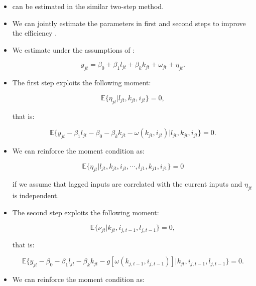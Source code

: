 \documentclass[]{book}
\providecommand{\tightlist}{%
  \setlength{\itemsep}{0pt}\setlength{\parskip}{0pt}}
\theoremstyle{definition}
\theoremstyle{definition}
\theoremstyle{definition}
\theoremstyle{remark}
\begin{document}
\begin{itemize}
\tightlist
\item
  \citet{Levinsohn2003} can be estimated in the similar two-step method.
\item
  We can jointly estimate the parameters in first and second steps to
  improve the efficiency \citep{Wooldridge2009}.
\item
  We estimate under the assumptions of \citet{Olley1996}:

  \begin{equation}
  y_{jt} = \beta_0 + \beta_1 l_{jt} + \beta_k k_{jt} + \omega_{jt} + \eta_{jt}.
  \end{equation}
\item
  The first step exploits the following moment:

  \begin{equation}
  \mathbb{E}\{\eta_{jt}|l_{jt}, k_{jt}, i_{jt}\} = 0,
  \end{equation}

  that is:

  \begin{equation}
  \mathbb{E}\{y_{jt} - \beta_1 l_{jt} - \beta_0 - \beta_k k_{jt} - \omega(k_{jt}, i_{jt})|l_{jt}, k_{jt}, i_{jt}\} = 0. \label{eq:opfirst}
  \end{equation}
\item
  We can reinforce the moment condition as:

  \begin{equation}
  \mathbb{E}\{\eta_{jt}|l_{jt}, k_{jt}, i_{jt}, \cdots, l_{j1}, k_{j1}, i_{j1}\} = 0
  \end{equation}

  if we assume that lagged inputs are correlated with the current inputs
  and \(\eta_{jt}\) is independent.
\item
  The second step exploits the following moment:

  \begin{equation}
  \mathbb{E}\{\nu_{jt}|k_{jt}, i_{j, t - 1}, l_{j, t - 1}\} = 0,
  \end{equation}

  that is:

  \begin{equation}
  \mathbb{E}\{y_{jt} - \beta_0 - \beta_1 l_{jt} - \beta_k k_{jt} - g[\omega(k_{j,t - 1}, i_{j, t - 1})]|k_{jt}, i_{j, t - 1}, l_{j, t - 1}\} = 0. \label{eq:opsecond}
  \end{equation}
\item
  We can reinforce the moment condition as:


\end{itemize}
\end{document}
